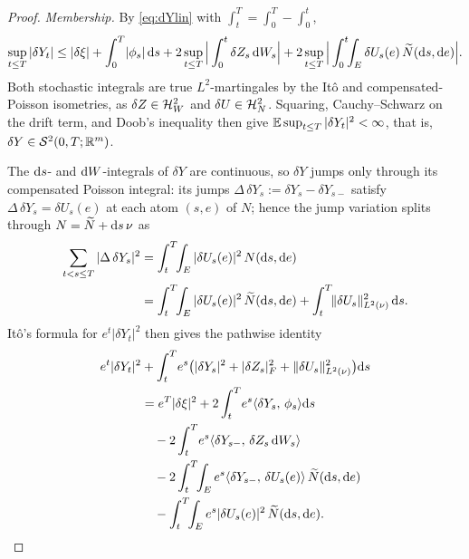 \begin{proof}
\emph{Membership.} By \eqref{eq:dYlin} with $\int_t^T=\int_0^T-\int_0^t$,
\[
\sup_{t\le T}|\delta Y_t|\le|\delta\xi|+\int_0^T\!|\phi_s|\,\mathrm{d} s
+2\sup_{t\le T}\Big|\int_0^t\delta Z_s\,\mathrm{d} W_s\Big|
+2\sup_{t\le T}\Big|\int_0^t\!\!\int_E\delta U_s(e)\,\widetilde{N}(\mathrm{d} s,\mathrm{d} e)\Big|.
\]
Both stochastic integrals are true $L^2$-martingales by the It\^o and
compensated-Poisson isometries, as $\delta Z\in\mathcal{H}^2_W$ and $\delta U\in\mathcal{H}^2_N$.
Squaring, Cauchy--Schwarz on the drift term, and Doob's inequality then give
$\mathbb{E}\sup_{t\le T}|\delta Y_t|^2<\infty$, that is, $\delta Y\in\mathcal{S}^2(0,T;\mathbb{R}^m)$.

The $\mathrm{d} s$- and $\mathrm{d} W$-integrals of $\delta Y$ are continuous, so
$\delta Y$ jumps only through its compensated Poisson integral: its jumps
$\Delta\,\delta Y_s:=\delta Y_s-\delta Y_{s-}$ satisfy $\Delta\,\delta Y_s=\delta U_s(e)$
at each atom $(s,e)$ of $N$; hence the jump variation
splits through $N=\widetilde{N}+\mathrm{d} s\,\nu$ as
\begin{align*}
\sum_{t<s\le T}|\Delta\,\delta Y_s|^2
&=\int_t^T\!\!\int_E|\delta U_s(e)|^2\,N(\mathrm{d} s,\mathrm{d} e)\\
&=\int_t^T\!\!\int_E|\delta U_s(e)|^2\,\widetilde{N}(\mathrm{d} s,\mathrm{d} e)
+\int_t^T\!\lVert \delta U_s\rVert_{L^2(\nu)}^2\,\mathrm{d} s.
\end{align*}
It\^o's formula for
$e^{t}|\delta Y_t|^2$ then gives the pathwise identity
\begin{equation}\label{eq:itoY2}
\begin{aligned}
e^{t}|\delta Y_t|^2
&+\int_t^T\!e^{s}\big(|\delta Y_s|^2+|\delta Z_s|_F^2+\lVert \delta U_s\rVert_{L^2(\nu)}^2\big)\mathrm{d} s\\
&=e^{T}|\delta\xi|^2+2\int_t^T\!e^{s}\langle \delta Y_s,\,\phi_s\rangle\mathrm{d} s\\
&\quad-2\int_t^T\!e^{s}\langle \delta Y_{s-},\,\delta Z_s\,\mathrm{d} W_s\rangle\\
&\quad-2\int_t^T\!\!\int_E e^{s}\langle \delta Y_{s-},\,\delta U_s(e)\rangle\,\widetilde{N}(\mathrm{d} s,\mathrm{d} e)\\
&\quad-\int_t^T\!\!\int_E e^{s}|\delta U_s(e)|^2\,\widetilde{N}(\mathrm{d} s,\mathrm{d} e).
\end{aligned}
\end{equation}


\end{proof}
